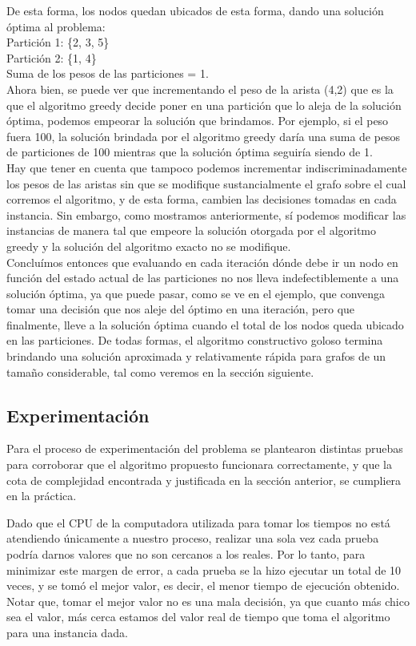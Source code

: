 \documentclass[10pt,a4paper]{article}
\begin{document}
\noindent De esta forma, los nodos quedan ubicados de esta forma, dando una solución óptima al problema:\\
Partición 1: \{2, 3, 5\}\\
Partición 2: \{1, 4\}\\
Suma de los pesos de las particiones = 1.\\


Ahora bien, se puede ver que incrementando el peso de la arista (4,2) que es la que el algoritmo greedy decide poner en una partición que lo aleja de la solución óptima, podemos empeorar la solución que brindamos. Por ejemplo, si el peso fuera 100, la solución brindada por el algoritmo greedy daría una suma de pesos de particiones de 100 mientras que la solución óptima seguiría siendo de 1.\\
Hay que tener en cuenta que tampoco podemos incrementar indiscriminadamente los pesos de las aristas sin que se modifique sustancialmente el grafo sobre el cual corremos el algoritmo, y de esta forma, cambien las decisiones tomadas en cada instancia. Sin embargo, como mostramos anteriormente, sí podemos modificar las instancias de manera tal que empeore la solución otorgada por el algoritmo greedy y la solución del algoritmo exacto no se modifique.\\

Concluímos entonces que evaluando en cada iteración dónde debe ir un nodo en función del estado actual de las particiones no nos lleva indefectiblemente a una solución óptima, ya que puede pasar, como se ve en el ejemplo, que convenga tomar una decisión que nos aleje del óptimo en una iteración, pero que finalmente, lleve a la solución óptima cuando el total de los nodos queda ubicado en las particiones. De todas formas, el algoritmo constructivo goloso termina brindando una solución aproximada y relativamente rápida para grafos de un tamaño considerable, tal como veremos en la sección siguiente.\\


\subsection{Experimentación}

Para el proceso de experimentación del problema se plantearon distintas pruebas para corroborar que el algoritmo propuesto funcionara correctamente, y que la cota de complejidad encontrada y justificada en la sección anterior, se cumpliera en la práctica.

\noindent Dado que el CPU de la computadora utilizada para tomar los tiempos no está atendiendo únicamente a nuestro proceso, realizar una sola vez cada prueba podría darnos valores que no son cercanos a los reales. Por lo tanto, para minimizar este margen de error, a cada prueba se la hizo ejecutar un total de 10 veces, y se tomó el mejor valor, es decir, el menor tiempo de ejecución obtenido. Notar que, tomar el mejor valor no es una mala decisión, ya que cuanto más chico sea el valor, más cerca estamos del valor real de tiempo que toma el algoritmo para una instancia dada.\\
\end{document}
